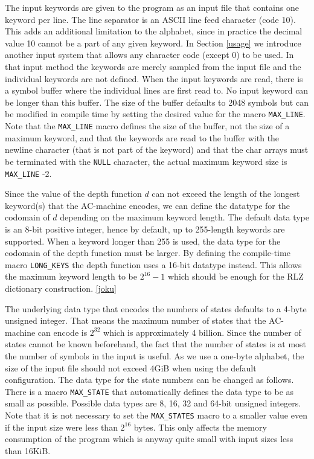 \documentclass[english,twoside,censored,csm,algorithms-track-2020]{HYthesisML}
\theoremstyle{plain}
\theoremstyle{definition}
\begin{document}
The input keywords are given to the program as an input file that contains one keyword per line. The
line separator is an ASCII line feed character (code 10). This adds an additional limitation to the
alphabet, since in practice the decimal value 10 cannot be a part of any given keyword. In Section
\ref{usage} we introduce another input system that allows any character code (except 0) to be used. In
that input method the keywords are merely sampled from the input file and the individual keywords
are not defined. When the input keywords are read, there is a symbol buffer where the individual lines
are first read to. No input keyword can be longer than this buffer. The size of the buffer defaults
to 2048 symbols but can be modified in compile time by setting the desired value for the macro
\texttt{MAX\_LINE}.
Note that the \texttt{MAX\_LINE} macro defines the size of the buffer, not the size of a maximum
keyword, and
that the keywords are read to the buffer with the newline character (that is not part of the keyword)
and that the char arrays must be terminated with the \texttt{NULL} character, the actual maximum
keyword size is \texttt{MAX\_LINE} -2.

Since the value of the depth function $d$ can not exceed the length of the longest keyword(s) that the
AC-machine encodes, we can define the datatype for the codomain of $d$ depending on the maximum
keyword length. The default data type is an 8-bit positive integer, hence by default,
up to 255-length keywords are supported.
When a keyword longer than 255 is used, the data type for the codomain of the depth function
must be larger. By defining the compile-time macro \texttt{LONG\_KEYS} the depth function
uses a 16-bit datatype instead. This allows the maximum keyword length to be $2^{16}-1$ which
should be enough for the RLZ dictionary construction. \ref{joku}

The underlying data type that encodes the numbers of states defaults to a 4-byte unsigned integer. That
means the maximum number of states that the AC-machine can encode is $2^{32}$ which is approximately
4 billion. Since the number of states cannot be known beforehand, the fact that the number of states
is at most the number of symbols in the input is useful. As we use a one-byte alphabet, the size
of the input file should not exceed 4GiB when using the default configuration. The data type
for the state numbers can be changed as follows. There is a macro \texttt{MAX\_STATE} that automatically
defines the data type to be as small as possible. Possible data types are 8, 16, 32 and 64-bit
unsigned integers. Note that it is not necessary to set the \texttt{MAX\_STATES} macro to a smaller value
even if the input size were less than $2^{16}$ bytes. This only affects the memory consumption of
the program which is anyway quite small with input sizes less than 16KiB.
\end{document}
